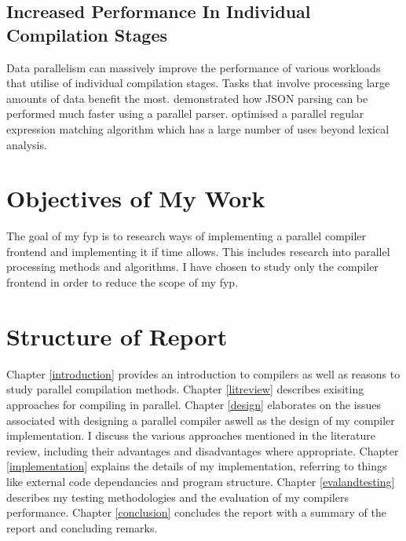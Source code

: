 \subsection{Increased Performance In Individual Compilation Stages}

Data parallelism can massively improve the performance of various workloads that
utilise of individual compilation stages. Tasks that involve processing large
amounts of data benefit the most. \cite{barenghi_parallel_2015} demonstrated
how JSON parsing can be performed much faster using a parallel parser.
\cite{mytkowicz_data-parallel_2014} optimised a parallel regular expression
matching algorithm which has a large number of uses beyond lexical analysis.

\section{Objectives of My Work}

The goal of my \ac{fyp} is to research ways of implementing a parallel compiler
frontend and implementing it if time allows. This includes research into
parallel processing methods and algorithms. I have chosen to study only the
compiler frontend in order to reduce the scope of my \ac{fyp}.

\section{Structure of Report}

Chapter \ref{introduction} provides an introduction to compilers as well as
reasons to study parallel compilation methods.
\newline \newline
Chapter \ref{litreview} describes exisiting approaches for compiling
in parallel.
\newline \newline
Chapter \ref{design} elaborates on the issues associated with designing a
parallel compiler aswell as the design of my compiler implementation. I discuss
the various approaches mentioned in the literature review, including their
advantages and disadvantages where appropriate.
\newline \newline
Chapter \ref{implementation} explains the details of my implementation,
referring to things like external code dependancies and program structure.
\newline \newline
Chapter \ref{evalandtesting} describes my testing methodologies and the evaluation of my compilers performance.
\newline \newline
Chapter \ref{conclusion} concludes the report with a summary of the report and
concluding remarks.
